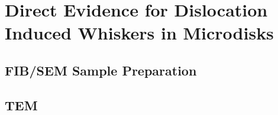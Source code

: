 \section[Experimental]{Direct Evidence for Dislocation Induced Whiskers in Microdisks} 
\subsection{FIB/SEM Sample Preparation}
\subsection{TEM}



